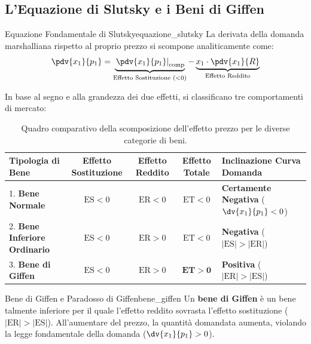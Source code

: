 \subsection{L'Equazione di Slutsky e i Beni di Giffen}

\begin{teorema}{Equazione Fondamentale di Slutsky}{equazione_slutsky}
La derivata della domanda marshalliana rispetto al proprio prezzo si scompone analiticamente come:
\begin{equation}
    \pdv{x_1}{p_1} = \underbrace{\left. \pdv{x_1}{p_1} \right|_{\text{comp}}}_{\text{Effetto Sostituzione } (< 0)} - \underbrace{x_1 \cdot \pdv{x_1}{R}}_{\text{Effetto Reddito}}
\end{equation}
\end{teorema}

In base al segno e alla grandezza dei due effetti, si classificano tre comportamenti di mercato:

\begin{table}[htbp]
\centering
\small
\renewcommand{\arraystretch}{1.35}
\begin{tabularx}{\textwidth}{l c c c X}
\toprule
\textbf{Tipologia di Bene} & \textbf{Effetto Sostituzione} & \textbf{Effetto Reddito} & \textbf{Effetto Totale} & \textbf{Inclinazione Curva Domanda} \\
\midrule
1. \textbf{Bene Normale} & $\text{ES} < 0$ & $\text{ER} < 0$ & $\text{ET} < 0$ & \textbf{Certamente Negativa} ($\dv{x_1}{p_1} < 0$) \\
2. \textbf{Bene Inferiore Ordinario} & $\text{ES} < 0$ & $\text{ER} > 0$ & $\text{ET} < 0$ & \textbf{Negativa} ($|\text{ES}| > |\text{ER}|$) \\
3. \textbf{Bene di Giffen} & $\text{ES} < 0$ & $\text{ER} > 0$ & $\mathbf{\text{ET} > 0}$ & \textbf{Positiva} ($|\text{ER}| > |\text{ES}|$) \\
\bottomrule
\end{tabularx}
\caption{Quadro comparativo della scomposizione dell'effetto prezzo per le diverse categorie di beni.}
\label{tab:scomposizione_slutsky_classi}
\end{table}

\begin{definizione}{Bene di Giffen e Paradosso di Giffen}{bene_giffen}
Un \textbf{bene di Giffen} è un bene talmente inferiore per il quale l'effetto reddito sovrasta l'effetto sostituzione ($|\text{ER}| > |\text{ES}|$). All'aumentare del prezzo, la quantità domandata aumenta, violando la legge fondamentale della domanda ($\dv{x_1}{p_1} > 0$).
\end{definizione}


